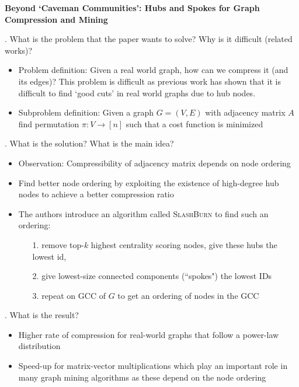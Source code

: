\documentclass[12pt]{article}
\begin{document}
 

{\Large\centering
    \textbf{Beyond `Caveman Communities': Hubs and Spokes for Graph Compression and Mining}
\par}

\bigskip

. What is the problem that the paper wants to solve? Why is it difficult (related works)?

\begin{itemize}
    \item Problem definition: Given a real world graph, how can we compress it (and its edges)? This problem is difficult as previous work has shown that it is difficult to find `good cuts' in real world graphs due to hub nodes.
    \item Subproblem definition: Given a graph $G=(V,E)$ with adjacency matrix $A$ find permutation $\pi: V \rightarrow [n]$ such that a cost function is minimized
\end{itemize}

. What is the solution? What is the main idea?

\begin{itemize}
    \item Observation: Compressibility of adjacency matrix depends on node ordering
    \item Find better node ordering by exploiting the existence of high-degree hub nodes to achieve a better compression ratio
    \item The authors introduce an algorithm called \textsc{SlashBurn} to find such an ordering:
    \begin{itemize}
        \item[1.] remove top-$k$ highest centrality scoring nodes, give these hubs the lowest id,
        \item[2.] give lowest-size connected components (``spokes") the lowest IDs
        \item[3.] repeat on GCC of $G$ to get an ordering of nodes in the GCC
    \end{itemize}
\end{itemize}

. What is the result?

\begin{itemize}
    \item Higher rate of compression for real-world graphs that follow a power-law distribution
    \item Speed-up for matrix-vector multiplications which play an important role in many graph mining algorithms as these depend on the node ordering
\end{itemize}
\end{document}
